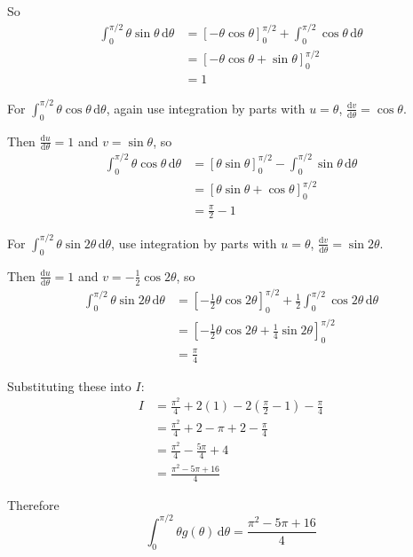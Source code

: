 \documentclass[leqno]{article}
\begin{document}
\begin{enumerate}[
  label=\textbf{\arabic*.},
  leftmargin=*,
  topsep=0pt,
  partopsep=0pt,
  parsep=0pt
]
\begin{djsSolution}
\begin{enumerate}[label=\textbf{(\alph*)}]
So
\begin{align*}
\int_{0}^{\pi/2}\theta\sin\theta\,\mathrm{d}\theta
&=\left[-\theta\cos\theta\right]_{0}^{\pi/2}
+\int_{0}^{\pi/2}\cos\theta\,\mathrm{d}\theta \\
&=\left[-\theta\cos\theta+\sin\theta\right]_{0}^{\pi/2} \\
&=1
\end{align*}

For \(\int_{0}^{\pi/2}\theta\cos\theta\,\mathrm{d}\theta\), again use integration by parts with
\(u=\theta\), \(\frac{\mathrm{d}v}{\mathrm{d}\theta}=\cos\theta\).

Then \(\frac{\mathrm{d}u}{\mathrm{d}\theta}=1\) and \(v=\sin\theta\), so
\begin{align*}
\int_{0}^{\pi/2}\theta\cos\theta\,\mathrm{d}\theta
&=\left[\theta\sin\theta\right]_{0}^{\pi/2}
-\int_{0}^{\pi/2}\sin\theta\,\mathrm{d}\theta \\
&=\left[\theta\sin\theta+\cos\theta\right]_{0}^{\pi/2} \\
&=\frac{\pi}{2}-1
\end{align*}

For \(\int_{0}^{\pi/2}\theta\sin 2\theta\,\mathrm{d}\theta\), use integration by parts with
\(u=\theta\), \(\frac{\mathrm{d}v}{\mathrm{d}\theta}=\sin 2\theta\).

Then \(\frac{\mathrm{d}u}{\mathrm{d}\theta}=1\) and \(v=-\frac12\cos 2\theta\), so
\begin{align*}
\int_{0}^{\pi/2}\theta\sin 2\theta\,\mathrm{d}\theta
&=\left[-\frac12\theta\cos 2\theta\right]_{0}^{\pi/2}
+\frac12\int_{0}^{\pi/2}\cos 2\theta\,\mathrm{d}\theta \\
&=\left[-\frac12\theta\cos 2\theta+\frac14\sin 2\theta\right]_{0}^{\pi/2} \\
&=\frac{\pi}{4}
\end{align*}

Substituting these into \(I\):
\begin{align*}
I
&=\frac{\pi^2}{4}+2(1)-2\left(\frac{\pi}{2}-1\right)-\frac{\pi}{4} \\
&=\frac{\pi^2}{4}+2-\pi+2-\frac{\pi}{4} \\
&=\frac{\pi^2}{4}-\frac{5\pi}{4}+4 \\
&=\frac{\pi^2-5\pi+16}{4}
\end{align*}

Therefore
\[
\int_{0}^{\pi/2}\theta g(\theta)\,\mathrm{d}\theta=\frac{\pi^2-5\pi+16}{4}
\]
\end{enumerate}
\end{djsSolution}



\end{enumerate}
\end{document}
